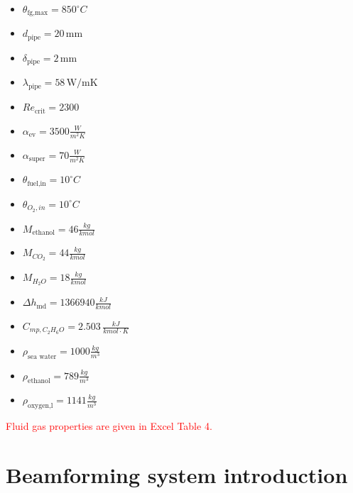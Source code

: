 \documentclass[openany]{book}
\begin{document}
	\begin{itemize}
		\item $\theta_\textrm{fg,max} = 850 ^\circ C$
		\item $d_\textrm{pipe} = 20 \,\textrm{mm}$
		\item $\delta_\textrm{pipe} = 2 \,\textrm{mm}$
		\item $\lambda_\textrm{pipe}  = 58 \,\textrm{W/mK}$
		\item $Re_\textrm{crit} = 2300$
		\item $\alpha_\textrm{ev} = 3500 \frac{W}{m^2K}$
		\item $\alpha_\textrm{super} = 70 \frac{W}{m^2K}$
		\item $\theta_\textrm{fuel,in} = 10 ^\circ C$
		\item $\theta_{O_2,in} = 10 ^\circ C$
		\item $M_\textrm{ethanol} = 46 \frac{kg}{kmol}$
		\item $M_{CO_2} = 44 \frac{kg}{kmol}$
		\item $M_{H_2O} = 18 \frac{kg}{kmol}$
		\item $\Delta h_\textrm{md} = 1366940 \frac{kJ}{kmol}$
		\item $C_{mp,C_2H_6O} = 2.503 \,\frac{kJ}{kmol \cdot K}$
		\item $\rho_\textrm{sea\ water} = 1000 \frac{kg}{m^3}$
		\item $\rho_\textrm{ethanol} = 789 \frac{kg}{m^3}$
		\item $\rho_\textrm{oxygen,l} = 1141 \frac{kg}{m^3}$
	\end{itemize}
	
	\noindent
	\textcolor{red}{Fluid gas properties are given in Excel Table 4.}
	
	\clearpage
	
	\section{Beamforming system introduction}
	
\end{document}
